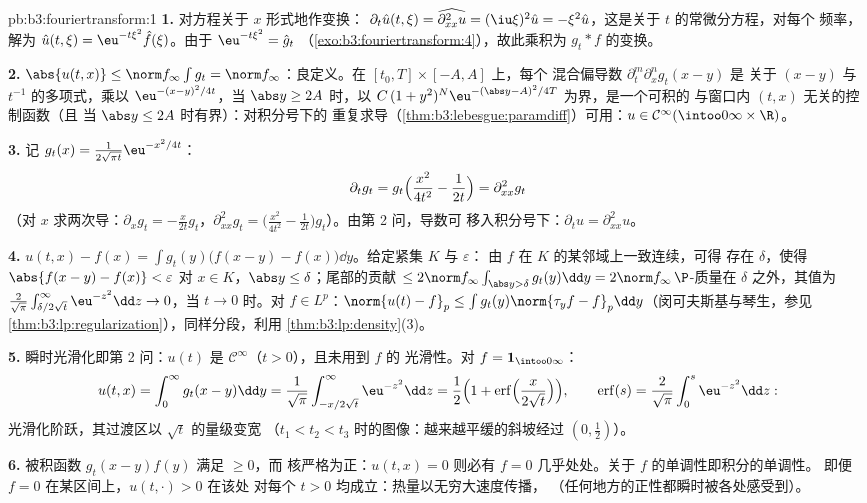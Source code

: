 \begin{solution}{pb:b3:fouriertransform:1}
\textbf{1.} 对方程关于 $x$ 形式地作变换：
$\partial_t\hat u(t,\xi) = \widehat{\partial^2_{xx}u} =
(\iu\xi)^2\hat u = -\xi^2\hat u$，这是关于 $t$ 的常微分方程，对每个
频率，解为 $\hat u(t,\xi) = \eu^{-t\xi^2}\hat f(\xi)$。由于
$\eu^{-t\xi^2} = \hat g_t$
（\cref{exo:b3:fouriertransform:4}），故此乘积为
$g_t * f$ 的变换。

\textbf{2.} $\abs{u(t,x)} \leq \norm f_\infty\int g_t = \norm
f_\infty$：良定义。在 $[t_0, T]\times[-A, A]$ 上，每个
混合偏导数 $\partial^m_t\partial^n_xg_t(x - y)$ 是
关于 $(x - y)$ 与 $t^{-1}$ 的多项式，乘以
$\eu^{-(x-y)^2/4t}$，当 $\abs y \geq 2A$ 时，以
$C\,(1 + y^2)^N\eu^{-(\abs y - A)^2/4T}$ 为界，是一个可积的
与窗口内 $(t, x)$ 无关的控制函数（且
当 $\abs y \leq 2A$ 时有界）：对积分号下的
重复求导（\cref{thm:b3:lebesgue:paramdiff}）可用：$u \in
\mathcal C^\infty(\intoo0\infty\times\R)$。

\textbf{3.} 记 $g_t(x) = \frac1{2\sqrt{\pi
t}}\eu^{-x^2/4t}$：
\[
\partial_tg_t = g_t\Bigl(\frac{x^2}{4t^2} - \frac1{2t}\Bigr)
= \partial^2_{xx}g_t
\]
（对 $x$ 求两次导：$\partial_xg_t = -\frac
x{2t}g_t$，$\partial^2_{xx}g_t = \bigl(\frac{x^2}{4t^2} -
\frac1{2t}\bigr)g_t$）。由第 2 问，导数可
移入积分号下：$\partial_tu = \partial^2_{xx}u$。

\textbf{4.} $u(t,x) - f(x) = \int g_t(y)\bigl(f(x - y) -
f(x)\bigr)\dd y$。给定紧集 $K$ 与 $\varepsilon$：
由 $f$ 在 $K$ 的某邻域上一致连续，可得
存在 $\delta$，使得 $\abs{f(x-y) - f(x)} < \varepsilon$ 对 $x \in
K$，$\abs y \leq \delta$；尾部的贡献 $\leq 2\norm
f_\infty\int_{\abs y > \delta}g_t(y)\dd y = 2\norm
f_\infty\,\P$-质量在 $\delta$ 之外，其值为
$\frac2{\sqrt\pi}\int_{\delta/2\sqrt t}^\infty\eu^{-z^2}\dd z
\to 0$，当 $t \to 0$ 时。对 $f \in L^p$：$\norm{u(t) - f}_p \leq
\int g_t(y)\norm{\tau_yf - f}_p\dd y$（闵可夫斯基与琴生，参见
\cref{thm:b3:lp:regularization}），同样分段，利用
\cref{thm:b3:lp:density}(3)。

\textbf{5.} 瞬时光滑化即第 2 问：$u(t)$ 是
$\mathcal C^\infty$（$t > 0$），且未用到 $f$ 的
光滑性。对 $f = \mathbf 1_{\intoo0\infty}$：
\[
u(t, x) = \int_0^\infty g_t(x - y)\dd y
= \frac1{\sqrt\pi}\int_{-x/2\sqrt t}^{\infty}\eu^{-z^2}\dd z
= \frac12\Bigl(1 +
\operatorname{erf}\Bigl(\frac{x}{2\sqrt t}\Bigr)\Bigr),
\qquad \operatorname{erf}(s) =
\frac2{\sqrt\pi}\int_0^s\eu^{-z^2}\dd z :
\]
光滑化阶跃，其过渡区以 $\sqrt t$ 的量级变宽
（$t_1 < t_2 < t_3$ 时的图像：越来越平缓的斜坡经过
$(0, \frac12)$）。

\textbf{6.} 被积函数 $g_t(x-y)f(y)$ 满足 $\geq 0$，而
核严格为正：$u(t,x) = 0$ 则必有 $f = 0$
几乎处处。关于 $f$ 的单调性即积分的单调性。
即便 $f = 0$ 在某区间上，$u(t, \cdot) > 0$ 在该处
对每个 $t > 0$ 均成立：热量以无穷大速度传播，
（任何地方的正性都瞬时被各处感受到）。


\end{solution}
